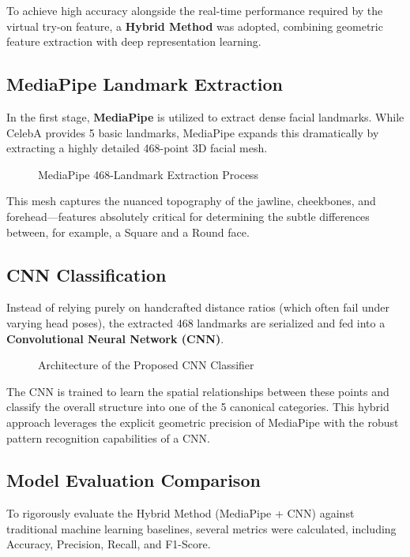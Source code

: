 To achieve high accuracy alongside the real-time performance required by the virtual try-on feature, a \textbf{Hybrid Method} was adopted, combining geometric feature extraction with deep representation learning.

\subsection{MediaPipe Landmark Extraction}
In the first stage, \textbf{MediaPipe} is utilized to extract dense facial landmarks. While CelebA provides 5 basic landmarks, MediaPipe expands this dramatically by extracting a highly detailed 468-point 3D facial mesh.

\begin{figure}[H]
    \centering
    \vspace{8cm}
    \caption{MediaPipe 468-Landmark Extraction Process}
    \label{fig:mediapipe_extraction}
\end{figure}

This mesh captures the nuanced topography of the jawline, cheekbones, and forehead—features absolutely critical for determining the subtle differences between, for example, a Square and a Round face.

\subsection{CNN Classification}
Instead of relying purely on handcrafted distance ratios (which often fail under varying head poses), the extracted 468 landmarks are serialized and fed into a \textbf{Convolutional Neural Network (CNN)}.

\begin{figure}[H]
    \centering
    \vspace{8cm}
    \caption{Architecture of the Proposed CNN Classifier}
    \label{fig:cnn_architecture}
\end{figure}

The CNN is trained to learn the spatial relationships between these points and classify the overall structure into one of the 5 canonical categories. This hybrid approach leverages the explicit geometric precision of MediaPipe with the robust pattern recognition capabilities of a CNN.

\subsection{Model Evaluation Comparison}
To rigorously evaluate the Hybrid Method (MediaPipe + CNN) against traditional machine learning baselines, several metrics were calculated, including Accuracy, Precision, Recall, and F1-Score.

